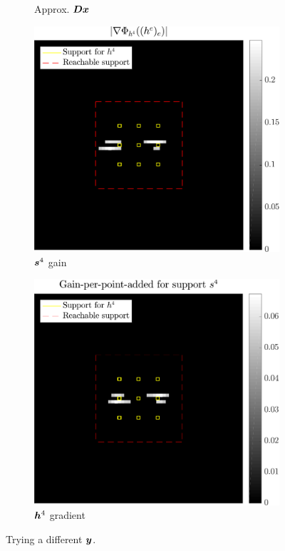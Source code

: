 \begin{figure}[!ht]
\begin{subfigure}[b]{0.22\textwidth}
	\caption{Approx. $\bm{D}\bm{x}$}
	\end{subfigure}
	\begin{subfigure}[b]{0.26\textwidth}\centering
	\includegraphics[width=\textwidth]{figures/xp/tilted_n4/xp_128x128_sc2_angl4_K3_S3_node4_partgrad4_bestvalues.pdf}
	\caption{$\bm{s}^4$ gain}
	\end{subfigure}
	\begin{subfigure}[b]{0.26\textwidth}\centering
	\includegraphics[width=\textwidth]{figures/xp/tilted_n4/xp_128x128_sc2_angl4_K3_S3_node4_objmatrix_bestvalues.pdf}
	\caption{$\bm{h}^4$ gradient}
	\end{subfigure}
\caption{Trying a different $\bm{y}$.}\label{fig_gain_tilted_n4}
\end{figure}


